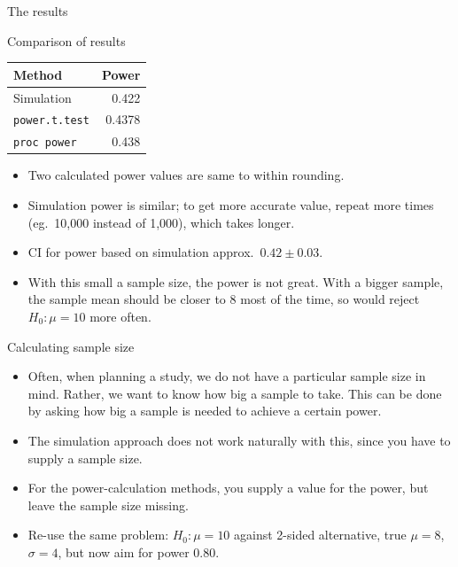 \documentclass[unknownkeysallowed]{beamer}\usepackage[]{graphicx}\usepackage[]{color}
\begin{document}
\begin{frame}[fragile]{The results}
  
  
\end{frame}

\begin{frame}[fragile]{Comparison of results}
  
  \begin{center}
  \begin{tabular}{lr}
    Method & Power\\
    \hline
    Simulation & 0.422\\
    \texttt{power.t.test} & 0.4378\\
    \texttt{proc power} & 0.438\\
    \hline
  \end{tabular}
    
  \end{center}
  
  \begin{itemize}
  \item Two calculated power values are same to within rounding.
  \item Simulation power is similar; to get more accurate value,
    repeat more times (eg.\ 10,000 instead of 1,000), which takes
    longer. 
  \item CI for power based on simulation approx.\ $0.42 \pm 0.03$.
  \item With this small a sample size, the power is not great. With a
    bigger sample, the sample mean should be closer to 8 most of the
    time, so would reject $H_0: \mu=10$ more often. 
  \end{itemize}
  
\end{frame}

\begin{frame}[fragile]{Calculating sample size}
  
  \begin{itemize}
  \item Often, when planning a study, we do not have a particular
    sample size in mind. Rather, we want to know how big a sample to
    take. This can be done by asking how big a sample is needed to
    achieve a certain power.
  \item The simulation approach does not work naturally with this,
    since you have to supply a sample size.
  \item For the power-calculation methods, you supply a value for the
    power, but leave the sample size missing.
  \item Re-use the same problem: $H_0: \mu=10$ against 2-sided
    alternative, true $\mu=8$, $\sigma=4$, but now aim for power 0.80.
  \end{itemize}
  
\end{frame}
\end{document}
